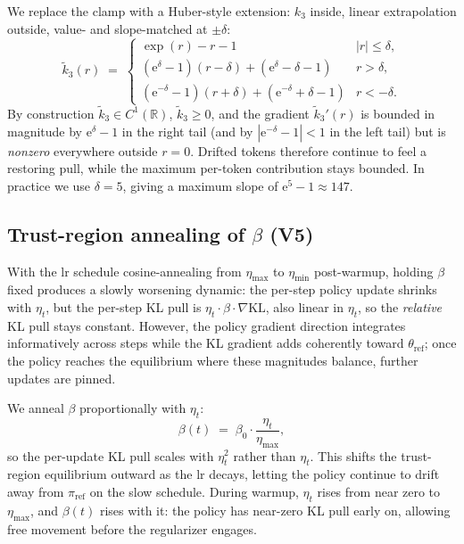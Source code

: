 \documentclass[11pt]{article}
\theoremstyle{definition}
\theoremstyle{remark}
\newcommand{\R}{\mathbb{R}}
\newcommand{\KL}{\mathrm{KL}}
\begin{document}
We replace the clamp with a Huber-style extension: $k_3$ inside, linear
extrapolation outside, value- and slope-matched at $\pm\delta$:
\begin{equation}
\tilde k_3(r) \;=\;
\begin{cases}
\exp(r) - r - 1
  & |r| \le \delta, \\[4pt]
(\mathrm{e}^{\delta} - 1)(r - \delta) + (\mathrm{e}^{\delta} - \delta - 1)
  & r > \delta, \\[4pt]
(\mathrm{e}^{-\delta} - 1)(r + \delta) + (\mathrm{e}^{-\delta} + \delta - 1)
  & r < -\delta.
\end{cases}
\label{eq:huber-kl}
\end{equation}
By construction $\tilde k_3 \in C^1(\R)$, $\tilde k_3 \ge 0$, and the
gradient $\tilde k_3'(r)$ is bounded in magnitude by $\mathrm{e}^{\delta} - 1$
in the right tail (and by $|\mathrm{e}^{-\delta} - 1| < 1$ in the left
tail) but is \emph{nonzero} everywhere outside $r = 0$.  Drifted tokens
therefore continue to feel a restoring pull, while the maximum per-token
contribution stays bounded.  In practice we use $\delta = 5$, giving a
maximum slope of $\mathrm{e}^5 - 1 \approx 147$.

\subsection{Trust-region annealing of $\beta$ (V5)}

With the lr schedule cosine-annealing from $\eta_{\max}$ to $\eta_{\min}$
post-warmup, holding $\beta$ fixed produces a slowly worsening dynamic:
the per-step policy update shrinks with $\eta_t$, but the per-step KL
pull is $\eta_t \cdot \beta \cdot \nabla\KL$, also linear in $\eta_t$, so
the \emph{relative} KL pull stays constant.  However, the policy gradient
direction integrates informatively across steps while the KL gradient
adds coherently toward $\theta_{\mathrm{ref}}$; once the policy reaches
the equilibrium where these magnitudes balance, further updates are pinned.

We anneal $\beta$ proportionally with $\eta_t$:
\begin{equation}
\beta(t) \;=\; \beta_0 \cdot \frac{\eta_t}{\eta_{\max}},
\label{eq:beta-anneal}
\end{equation}
so the per-update KL pull scales with $\eta_t^2$ rather than $\eta_t$.
This shifts the trust-region equilibrium outward as the lr decays, letting
the policy continue to drift away from $\pi_{\mathrm{ref}}$ on the slow
schedule.  During warmup, $\eta_t$ rises from near zero to $\eta_{\max}$,
and $\beta(t)$ rises with it: the policy has near-zero KL pull early on,
allowing free movement before the regularizer engages.
\end{document}
